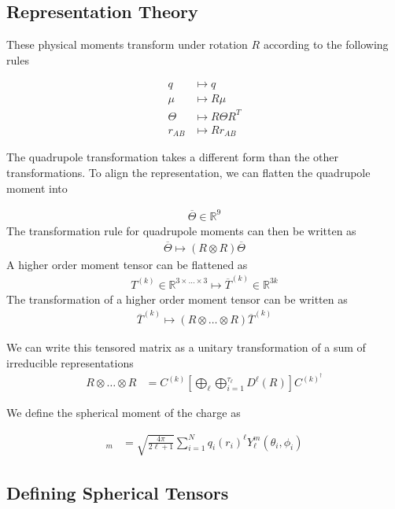 \documentclass[book.tex]{subfiles}
\begin{document}
\subsection{Representation Theory}

These physical moments transform under rotation $R$ according to the following rules

\begin{align}
    q &\mapsto q \\
    \mu &\mapsto R \mu \\
    \Theta &\mapsto R \Theta R^T \\
    r_{AB} &\mapsto R r_{AB}
\end{align}

The quadrupole transformation takes a different form than the other transformations. To align the representation, we can flatten the quadrupole moment into

\begin{align}
    \overline{\Theta} \in \mathbb{R}^9
\end{align}
The transformation rule for quadrupole moments can then be written as
\begin{align}
    \overline{\Theta} \mapsto (R \otimes R)\overline{\Theta}
\end{align}
A higher order moment tensor can be flattened as
\begin{align}
    T^{(k)} \in \mathbb{R}^{3 \times \dotsc \times 3} \mapsto \overline{T}^{(k)} \in \mathbb{R}^{3k}
\end{align}
The transformation of a higher order moment tensor can be written as
\begin{align}
    \overline{T}^{(k)} \mapsto (R\otimes \dotsc \otimes R) \overline{T}^{(k)}
\end{align}

We can write this tensored matrix as a unitary transformation of a sum of irreducible representations
\begin{align}
    R \otimes \dotsc \otimes R  &=  C^{(k)}\left [ \bigoplus_\ell \bigoplus_{i=1}^{\tau_\ell} D^{\ell}(R) \right ] C^{(k)^\dagger}
\end{align}

We define the spherical moment of the charge as

\begin{align}
    [Q_\ell]_m &= \sqrt{\frac{4\pi}{2 \ell + 1} } \sum_{i=1}^N q_i (r_i)^\ell Y^m_\ell(\theta_i, \phi_i)
\end{align}

\subsection{Defining Spherical Tensors}
\end{document}
